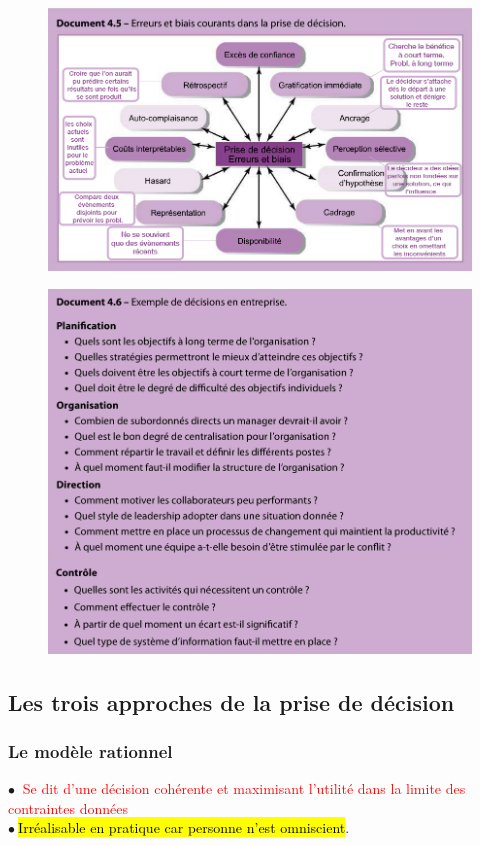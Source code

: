 \documentclass[letterpaper, 12pt]{article}
\newcommand{\red}[1]{
	\textcolor{red}{#1}
}
\newcommand{\point}{$\bullet\ $}
\begin{document}
		\begin{figure}[H]
			\centering
			\includegraphics[scale=0.75]{Images/erreurs}
		\end{figure}
		\begin{figure}[H]
			\centering
			\includegraphics[scale=0.75]{Images/decision2}
		\end{figure}
	\subsection{Les trois approches de la prise de d\'ecision}
		\subsubsection{Le mod\`ele rationnel}
			\point \red{Se dit d'une d\'ecision coh\'erente et maximisant l'utilit\'e dans la limite des
				contraintes donn\'ees}\\
			\point \hl{Irr\'ealisable en pratique car personne n'est omniscient}.
\end{document}
